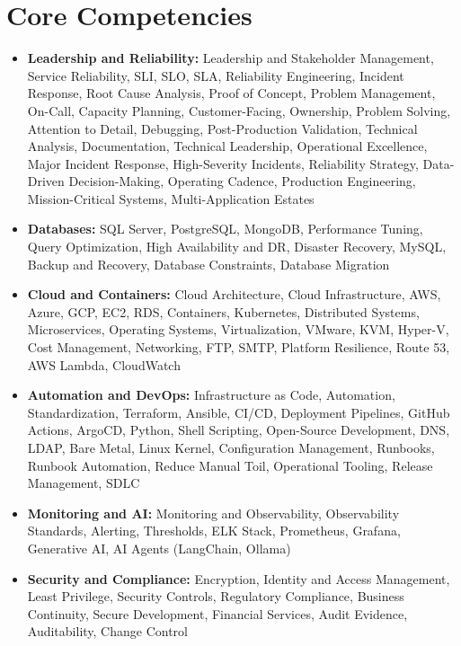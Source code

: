 \documentclass[10pt,a4paper]{article}
\begin{document}
\section{Core Competencies}
\begin{itemize}
  \item \textbf{Leadership and Reliability:} Leadership and Stakeholder Management, Service Reliability, SLI, SLO, SLA, Reliability Engineering, Incident Response, Root Cause Analysis, Proof of Concept, Problem Management, On-Call, Capacity Planning, Customer-Facing, Ownership, Problem Solving, Attention to Detail, Debugging, Post-Production Validation, Technical Analysis, Documentation, Technical Leadership, Operational Excellence, Major Incident Response, High-Severity Incidents, Reliability Strategy, Data-Driven Decision-Making, Operating Cadence, Production Engineering, Mission-Critical Systems, Multi-Application Estates
  \item \textbf{Databases:} SQL Server, PostgreSQL, MongoDB, Performance Tuning, Query Optimization, High Availability and DR, Disaster Recovery, MySQL, Backup and Recovery, Database Constraints, Database Migration
  \item \textbf{Cloud and Containers:} Cloud Architecture, Cloud Infrastructure, AWS, Azure, GCP, EC2, RDS, Containers, Kubernetes, Distributed Systems, Microservices, Operating Systems, Virtualization, VMware, KVM, Hyper-V, Cost Management, Networking, FTP, SMTP, Platform Resilience, Route 53, AWS Lambda, CloudWatch
  \item \textbf{Automation and DevOps:} Infrastructure as Code, Automation, Standardization, Terraform, Ansible, CI/CD, Deployment Pipelines, GitHub Actions, ArgoCD, Python, Shell Scripting, Open-Source Development, DNS, LDAP, Bare Metal, Linux Kernel, Configuration Management, Runbooks, Runbook Automation, Reduce Manual Toil, Operational Tooling, Release Management, SDLC
  \item \textbf{Monitoring and AI:} Monitoring and Observability, Observability Standards, Alerting, Thresholds, ELK Stack, Prometheus, Grafana, Generative AI, AI Agents (LangChain, Ollama)
  \item \textbf{Security and Compliance:} Encryption, Identity and Access Management, Least Privilege, Security Controls, Regulatory Compliance, Business Continuity, Secure Development, Financial Services, Audit Evidence, Auditability, Change Control
\end{itemize}
\end{document}
